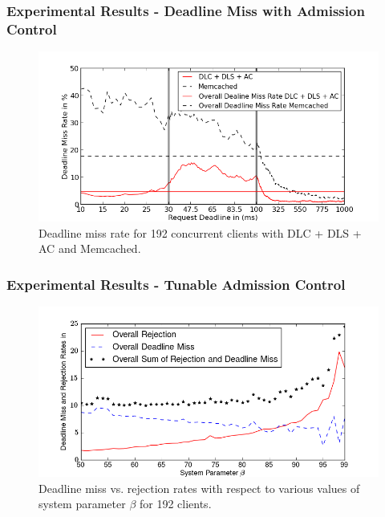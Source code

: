 \documentclass{beamer}
\begin{document}
\begin{frame}
  \frametitle{Experimental Results - Deadline Miss with Admission Control}
  \begin{figure}[t]
    \begin{center}
      \centerline{\includegraphics[scale=0.5]{img/EC2/EC2_AC_MM/miss_48.png}}
      \caption{Deadline miss rate for 192 concurrent clients with DLC + DLS + AC and Memcached.}
      \label{fig:miss_192_ac_mm}
    \end{center}
  \end{figure}
\end{frame}

\begin{frame}
  \frametitle{Experimental Results - Tunable Admission Control}
  \begin{figure}[t]
    \begin{center}
      \centerline{\includegraphics[scale=0.5]{img/EC2/Varying_ac/varying_acPerc_192.png}}
      \caption{Deadline miss vs. rejection rates with respect to various values of
        system parameter $\beta$ for 192 clients.}
      \label{fig:varying_ac}
    \end{center}
  \end{figure}
\end{frame}
\end{document}
